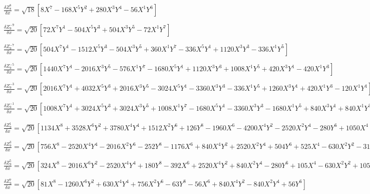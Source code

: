 \documentclass[10pt,landscape]{article}
\begin{document}
\vspace{1.2 mm}
\noindent $ \frac{\delta Z^{8}_{8}}{\delta x} = \sqrt{18} [8X^{7} -168X^{5}Y^{2} +280X^{3}Y^{4} -56X^{1}Y^{6}] $

\vspace{1.2 mm}
\noindent $ \frac{\delta Z^{-9}_{9}}{\delta x} = \sqrt{20} [72X^{7}Y^{1} -504X^{5}Y^{3} +504X^{3}Y^{5} -72X^{1}Y^{7}] $

\vspace{1.2 mm}
\noindent $ \frac{\delta Z^{-7}_{9}}{\delta x} = \sqrt{20} [504X^{7}Y^{1} -1512X^{5}Y^{3} -504X^{3}Y^{5} +360X^{1}Y^{7} -336X^{5}Y^{1} +1120X^{3}Y^{3} -336X^{1}Y^{5}] $

\vspace{1.2 mm}
\noindent $ \frac{\delta Z^{-5}_{9}}{\delta x} = \sqrt{20} [1440X^{7}Y^{1} -2016X^{3}Y^{5} -576X^{1}Y^{7} -1680X^{5}Y^{1} +1120X^{3}Y^{3} +1008X^{1}Y^{5} +420X^{3}Y^{1} -420X^{1}Y^{3}] $

\vspace{1.2 mm}
\noindent $ \frac{\delta Z^{-3}_{9}}{\delta x} = \sqrt{20} [2016X^{7}Y^{1} +4032X^{5}Y^{3} +2016X^{3}Y^{5} -3024X^{5}Y^{1} -3360X^{3}Y^{3} -336X^{1}Y^{5} +1260X^{3}Y^{1} +420X^{1}Y^{3} -120X^{1}Y^{1}] $

\vspace{1.2 mm}
\noindent $ \frac{\delta Z^{-1}_{9}}{\delta x} = \sqrt{20} [1008X^{7}Y^{1} +3024X^{5}Y^{3} +3024X^{3}Y^{5} +1008X^{1}Y^{7} -1680X^{5}Y^{1} -3360X^{3}Y^{3} -1680X^{1}Y^{5} +840X^{3}Y^{1} +840X^{1}Y^{3} -120X^{1}Y^{1}] $

\vspace{1.2 mm}
\noindent $ \frac{\delta Z^{1}_{9}}{\delta x} = \sqrt{20} [1134X^{8} +3528X^{6}Y^{2} +3780X^{4}Y^{4} +1512X^{2}Y^{6} +126Y^{8} -1960X^{6} -4200X^{4}Y^{2} -2520X^{2}Y^{4} -280Y^{6} +1050X^{4} +1260X^{2}Y^{2} +210Y^{4} -180X^{2} -60Y^{2} +5] $

\vspace{1.2 mm}
\noindent $ \frac{\delta Z^{3}_{9}}{\delta x} = \sqrt{20} [756X^{8} -2520X^{4}Y^{4} -2016X^{2}Y^{6} -252Y^{8} -1176X^{6} +840X^{4}Y^{2} +2520X^{2}Y^{4} +504Y^{6} +525X^{4} -630X^{2}Y^{2} -315Y^{4} -60X^{2} +60Y^{2}] $

\vspace{1.2 mm}
\noindent $ \frac{\delta Z^{5}_{9}}{\delta x} = \sqrt{20} [324X^{8} -2016X^{6}Y^{2} -2520X^{4}Y^{4} +180Y^{8} -392X^{6} +2520X^{4}Y^{2} +840X^{2}Y^{4} -280Y^{6} +105X^{4} -630X^{2}Y^{2} +105Y^{4}] $

\vspace{1.2 mm}
\noindent $ \frac{\delta Z^{7}_{9}}{\delta x} = \sqrt{20} [81X^{8} -1260X^{6}Y^{2} +630X^{4}Y^{4} +756X^{2}Y^{6} -63Y^{8} -56X^{6} +840X^{4}Y^{2} -840X^{2}Y^{4} +56Y^{6}] $
\end{document}
